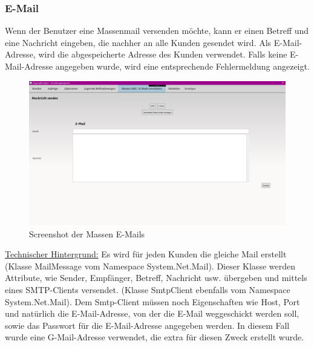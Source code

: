 \subsubsection{E-Mail}
Wenn der Benutzer eine Massenmail versenden möchte, kann er einen Betreff und eine Nachricht eingeben, die nachher an alle Kunden gesendet wird. Als E-Mail-Adresse, wird die abgespeicherte Adresse des Kunden verwendet. Falls keine E-Mail-Adresse angegeben wurde, wird eine entsprechende Fehlermeldung angezeigt.

\begin{figure}[H]
\begin{center}
	\includegraphics[scale=.25]{images/Massenemail.png}
\end{center}
	\caption{Screenshot der Massen E-Mails}
	\label{fig:sample}
\end{figure}
\underline{Technischer Hintergrund:}
\medskip
\linebreak
Es wird für jeden Kunden die gleiche Mail erstellt (Klasse MailMessage vom Namespace System.Net.Mail). Dieser Klasse werden Attribute, wie Sender, Empfänger, Betreff, Nachricht usw. übergeben und mittels eines SMTP-Clients versendet. (Klasse SmtpClient ebenfalls vom Namespace System.Net.Mail). Dem Smtp-Client müssen noch Eigenschaften wie Host, Port und natürlich die E-Mail-Adresse, von der die E-Mail weggeschickt werden soll, sowie das Passwort für die E-Mail-Adresse angegeben werden. In diesem Fall wurde eine G-Mail-Adresse verwendet, die extra für diesen Zweck erstellt wurde.

